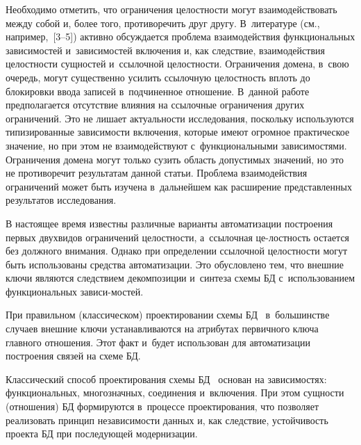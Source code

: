 \begin{multicols}{2}
  Необходимо отметить, что ограничения целостности могут
взаимодействовать между собой и, более того, противоречить друг другу.
В~литературе (см., например,~[3--5]) активно об\-суж\-да\-ет\-ся проблема
взаимодействия функциональных зависимостей и~зависимостей включения и,
как следствие, взаимодействия целостности сущностей и~ссылочной
целостности. Ограничения домена, в~свою очередь, могут существенно усилить
ссылочную целостность вплоть до блокировки ввода записей в~подчиненное
отношение. В~данной работе предполагается отсутствие влияния на ссылочные
ограничения других ограничений. Это не лишает актуальности исследования,
поскольку используются типизированные зависимости включения, которые
имеют огромное практическое значение, но при этом не вза\-и\-мо\-дей\-ст\-ву\-ют с~функциональными зависимостями. Ограничения домена могут только сузить
область допустимых значений, но это не противоречит результатам данной
статьи. Проблема взаимодействия ограничений может быть изучена в~дальнейшем как расширение представленных результатов исследования.

  В настоящее время известны различные варианты автоматизации построения
первых двух\linebreak видов ограничений целостности, а~ссылочная це-\linebreak ло\-стность остается
без должного внимания. Од\-нако при определении ссылочной целостности
могут быть использованы средства автоматизации. Это обусловлено тем, что
внешние ключи являются следствием декомпозиции и~синтеза схемы БД 
с~использованием функциональных зависи-\linebreak мостей. 

При правильном
(классическом) проектировании схемы БД~\cite{4-z, 3-z} в~большинстве
случаев внешние ключи устанавливаются на атрибутах первичного ключа
главного отношения. Этот факт и~будет использован для автоматизации
построения связей на схеме БД.

  Классический способ проектирования схемы БД~\cite{4-z, 3-z} основан на
зависимостях: функ\-ци\-о\-наль\-ных, многозначных, соединения и~включения. При
этом сущности (отношения) БД формируются в~процессе проектирования, что
позволяет реализовать принцип независимости данных и, как следствие,
устойчивость проекта БД при последующей модернизации. 


\end{multicols}
